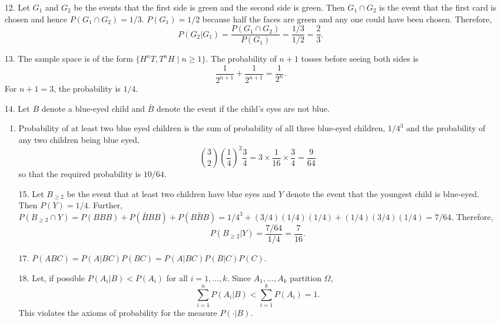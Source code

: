 \documentclass{article}
\begin{document}
\begin{enumerate}
\item[12.] Let $G_1$ and $G_2$ be the events that the first side is green and the
second side is green. Then $G_1 \cap G_2$ is the event that the first card is 
chosen and hence $P(G_1 \cap G_2) = 1/3$. $P(G_1) = 1/2$ because half the faces
are green and any one could have been chosen. Therefore,
\[
P(G_2 | G_1) = \frac{P(G_1 \cap G_2)}{P(G_1)} = \frac{1/3}{1/2} = \frac{2}{3}.
\]

\item[13.] The sample space is of the form $\{H^nT, T^nH \;|\; n \ge 1\}$. The
probability of $n + 1$ tosses before seeing both sides is 
\[
\frac{1}{2^{n+1}} + \frac{1}{2^{n+1}} = \frac{1}{2^n}.
\]
For $n + 1 = 3$, the probability is $1/4$.

\item[14.] Let $B$ denote a blue-eyed child and $\bar{B}$ denote the event if the
child's eyes are not blue.
\begin{enumerate}
\item Probability of at least two blue eyed children is the sum of probability of
all three blue-eyed children, $1/4^3$ and the probability of any two children
being blue eyed,
\[
\binom{3}{2}\left(\frac{1}{4}\right)^2\frac{3}{4} = 3\times\frac{1}{16}\times\frac{3}{4}
= \frac{9}{64}
\]
so that the required probability is $10/64$.

\item[15.] Let $B_{\ge 2}$ be the event that at least two children have blue eyes and
$Y$ denote the event that the youngest child is blue-eyed. Then $P(Y) = 1/4$.
Further, $P(B_{\ge 2} \cap Y) = P(BBB) + P(\bar{B}BB) + P(B\bar{B}B) = 1/4^3 +
(3/4)(1/4)(1/4) + (1/4)(3/4)(1/4) = 7/64$. Therefore,
\[
P(B_{\ge 2} | Y) = \frac{7/64}{1/4} = \frac{7}{16}.
\]

\item[17.] $P(ABC) = P(A|BC)P(BC) = P(A|BC)P(B|C)P(C)$.

\item[18.] Let, if possible $P(A_i | B) < P(A_i)$ for all $i = 1, \ldots, k$. 
Since $A_1, \ldots, A_k$ partition $\Omega$,
\[
\sum_{i=1}^n P(A_i|B) < \sum_{i=1}^k P(A_i) = 1.
\]
This violates the axioms of probability for the measure $P(\cdot|B)$.
\end{enumerate}
\end{enumerate}
\end{document}
